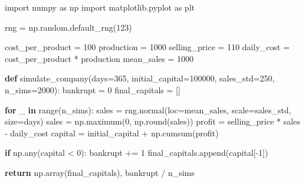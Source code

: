 \documentclass[
  letterpaper,
  DIV=11,
  numbers=noendperiod]{scrreprt}
\newenvironment{Shaded}{\begin{snugshade}}{\end{snugshade}}
\newcommand{\BuiltInTok}[1]{\textcolor[rgb]{0.00,0.23,0.31}{#1}}
\newcommand{\ControlFlowTok}[1]{\textcolor[rgb]{0.00,0.23,0.31}{\textbf{#1}}}
\newcommand{\DecValTok}[1]{\textcolor[rgb]{0.68,0.00,0.00}{#1}}
\newcommand{\ImportTok}[1]{\textcolor[rgb]{0.00,0.46,0.62}{#1}}
\newcommand{\KeywordTok}[1]{\textcolor[rgb]{0.00,0.23,0.31}{\textbf{#1}}}
\newcommand{\NormalTok}[1]{\textcolor[rgb]{0.00,0.23,0.31}{#1}}
\newcommand{\OperatorTok}[1]{\textcolor[rgb]{0.37,0.37,0.37}{#1}}
\begin{document}
\begin{Shaded}
\begin{Highlighting}[]
\ImportTok{import}\NormalTok{ numpy }\ImportTok{as}\NormalTok{ np}
\ImportTok{import}\NormalTok{ matplotlib.pyplot }\ImportTok{as}\NormalTok{ plt}

\NormalTok{rng }\OperatorTok{=}\NormalTok{ np.random.default\_rng(}\DecValTok{123}\NormalTok{)}

\NormalTok{cost\_per\_product }\OperatorTok{=} \DecValTok{100}
\NormalTok{production }\OperatorTok{=} \DecValTok{1000}
\NormalTok{selling\_price }\OperatorTok{=} \DecValTok{110}
\NormalTok{daily\_cost }\OperatorTok{=}\NormalTok{ cost\_per\_product }\OperatorTok{*}\NormalTok{ production}
\NormalTok{mean\_sales }\OperatorTok{=} \DecValTok{1000}

\KeywordTok{def}\NormalTok{ simulate\_company(days}\OperatorTok{=}\DecValTok{365}\NormalTok{, initial\_capital}\OperatorTok{=}\DecValTok{100000}\NormalTok{, sales\_std}\OperatorTok{=}\DecValTok{250}\NormalTok{, n\_sims}\OperatorTok{=}\DecValTok{2000}\NormalTok{):}
\NormalTok{    bankrupt }\OperatorTok{=} \DecValTok{0}
\NormalTok{    final\_capitals }\OperatorTok{=}\NormalTok{ []}

    \ControlFlowTok{for}\NormalTok{ \_ }\KeywordTok{in} \BuiltInTok{range}\NormalTok{(n\_sims):}
\NormalTok{        sales }\OperatorTok{=}\NormalTok{ rng.normal(loc}\OperatorTok{=}\NormalTok{mean\_sales, scale}\OperatorTok{=}\NormalTok{sales\_std, size}\OperatorTok{=}\NormalTok{days)}
\NormalTok{        sales }\OperatorTok{=}\NormalTok{ np.maximum(}\DecValTok{0}\NormalTok{, np.}\BuiltInTok{round}\NormalTok{(sales))}
\NormalTok{        profit }\OperatorTok{=}\NormalTok{ selling\_price }\OperatorTok{*}\NormalTok{ sales }\OperatorTok{{-}}\NormalTok{ daily\_cost}
\NormalTok{        capital }\OperatorTok{=}\NormalTok{ initial\_capital }\OperatorTok{+}\NormalTok{ np.cumsum(profit)}

        \ControlFlowTok{if}\NormalTok{ np.}\BuiltInTok{any}\NormalTok{(capital }\OperatorTok{\textless{}} \DecValTok{0}\NormalTok{):}
\NormalTok{            bankrupt }\OperatorTok{+=} \DecValTok{1}
\NormalTok{        final\_capitals.append(capital[}\OperatorTok{{-}}\DecValTok{1}\NormalTok{])}

    \ControlFlowTok{return}\NormalTok{ np.array(final\_capitals), bankrupt }\OperatorTok{/}\NormalTok{ n\_sims}
\end{Highlighting}
\end{Shaded}
\end{document}
